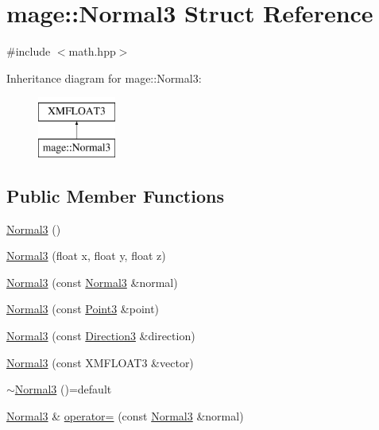 \hypertarget{structmage_1_1_normal3}{}\section{mage\+:\+:Normal3 Struct Reference}
\label{structmage_1_1_normal3}


{\ttfamily \#include $<$math.\+hpp$>$}

Inheritance diagram for mage\+:\+:Normal3\+:\begin{figure}[H]
\begin{center}
\leavevmode
\includegraphics[height=2.000000cm]{structmage_1_1_normal3}
\end{center}
\end{figure}
\subsection*{Public Member Functions}
\begin{DoxyCompactItemize}
\item 
\hyperlink{structmage_1_1_normal3_a66ec99f0de4f8231f747e37a4da65cc4}{Normal3} ()
\item 
\hyperlink{structmage_1_1_normal3_a59094c1f96a9721cd8846c5c6ec06f93}{Normal3} (float x, float y, float z)
\item 
\hyperlink{structmage_1_1_normal3_ada9c762e16b51177f3fc1aa6d5310b20}{Normal3} (const \hyperlink{structmage_1_1_normal3}{Normal3} \&normal)
\item 
\hyperlink{structmage_1_1_normal3_a1a58b2fcb3920ff68007257ae6434273}{Normal3} (const \hyperlink{structmage_1_1_point3}{Point3} \&point)
\item 
\hyperlink{structmage_1_1_normal3_a0942e7aace8354f0a414f77ccf90b69c}{Normal3} (const \hyperlink{structmage_1_1_direction3}{Direction3} \&direction)
\item 
\hyperlink{structmage_1_1_normal3_a61565f1183535666a2fb5183b83bebd2}{Normal3} (const X\+M\+F\+L\+O\+A\+T3 \&vector)
\item 
\hyperlink{structmage_1_1_normal3_a3384b2970fd85fe729514ce0686b4446}{$\sim$\+Normal3} ()=default
\item 
\hyperlink{structmage_1_1_normal3}{Normal3} \& \hyperlink{structmage_1_1_normal3_ade86357989ceaecf1b22bb9e53ca7fed}{operator=} (const \hyperlink{structmage_1_1_normal3}{Normal3} \&normal)
\end{DoxyCompactItemize}


